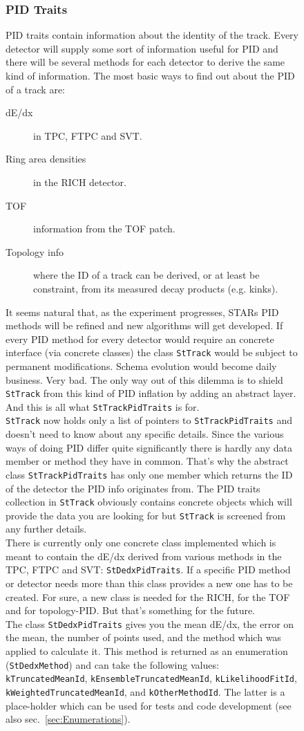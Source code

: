 \documentclass[twoside]{article}
\begin{document}
\begin{figure}[htb]
\begin{center}
\subsubsection{PID Traits}
\label{sec:pidTraits}
PID traits contain information about the identity of the track. Every
detector will supply some sort of information useful for PID and there
will be several methods for each detector to derive the same kind of
information. The most basic ways to find out about the PID of a track
are:
\begin{description}
\item[dE/dx] in TPC, FTPC and SVT.
\item[Ring area densities] in the RICH detector.
\item[TOF] information from the TOF patch.
\item[Topology info] where the ID of a track can be derived, or at
    least be constraint, from its measured decay products (e.g.
    kinks).
\end{description}
It seems natural that, as the experiment progresses, STARs PID methods
will be refined and new algorithms will get developed. If every PID
method for every detector would require an concrete interface (via
concrete classes) the class \texttt{StTrack} would be subject to
permanent modifications. Schema evolution would become daily business.
Very bad.  The only way out of this dilemma is to shield
\texttt{StTrack} from this kind of PID inflation by adding
an abstract layer. And this is all what \texttt{StTrackPidTraits} is for.\\
\texttt{StTrack} now holds only a list of pointers to
\texttt{StTrackPidTraits} and doesn't need to know about any specific
details. Since the various ways of doing PID differ quite
significantly there is hardly any data member or method they have in
common.  That's why the abstract class \texttt{StTrackPidTraits} has
only one member which returns the ID of the detector the PID info
originates from.  The PID traits collection in \texttt{StTrack}
obviously contains concrete objects which will provide the data you
are looking for but \texttt{StTrack} is screened from any further details. \\
There is currently only one concrete class implemented which is meant
to contain the dE/dx derived from various methods in the TPC, FTPC and
SVT: \texttt{StDedxPidTraits}. If a specific PID method or detector
needs more than this class provides a new one has to be created. For
sure, a new class is needed for the RICH, for the TOF and for
topology-PID.  But that's something
for the future.\\
The class \texttt{StDedxPidTraits} gives you the mean dE/dx, the error
on the mean, the number of points used, and the method which was applied to
calculate it.  This method is returned as an enumeration
(\texttt{StDedxMethod}) and can take the following values:
\texttt{kTruncatedMeanId}, \texttt{kEnsembleTruncatedMeanId},
\texttt{kLikelihoodFitId}, \texttt{kWeightedTruncatedMeanId}, and
\texttt{kOtherMethodId}. The latter is a place-holder which can be
used for tests and code development (see also
sec.~\ref{sec:Enumerations}).


\end{center}
\end{figure}
\end{document}
